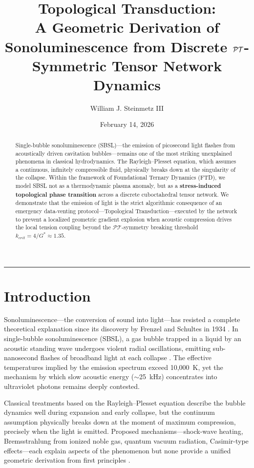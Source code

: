 \documentclass[11pt, letterpaper]{article}
\title{\vspace{-3em}\textbf{Topological Transduction:\\ \large A Geometric Derivation of Sonoluminescence from Discrete $\PT$-Symmetric Tensor Network Dynamics}}
\author[1]{William J. Steinmetz III}
\affil[1]{\textit{Foundational Ternary Dynamics Research}}
\date{February 14, 2026}
\newcommand{\G}{G^*}
\newcommand{\PT}{\mathcal{PT}}
\theoremstyle{definition}
\theoremstyle{remark}
\begin{document}
\maketitle

\begin{abstract}
Single-bubble sonoluminescence (SBSL)---the emission of picosecond light flashes from acoustically driven cavitation bubbles---remains one of the most striking unexplained phenomena in classical hydrodynamics. The Rayleigh--Plesset equation, which assumes a continuous, infinitely compressible fluid, physically breaks down at the singularity of the collapse. Within the framework of Foundational Ternary Dynamics (FTD), we model SBSL not as a thermodynamic plasma anomaly, but as a \textbf{stress-induced topological phase transition} across a discrete cuboctahedral tensor network. We demonstrate that the emission of light is the strict algorithmic consequence of an emergency data-venting protocol---Topological Transduction---executed by the network to prevent a localized geometric gradient explosion when acoustic compression drives the local tension coupling beyond the $\PT$-symmetry breaking threshold $k_{crit} = 4/\G \approx 1.35$.
\end{abstract}

\vspace{1em}
\hrule
\vspace{1.5em}

\section{Introduction}

Sonoluminescence---the conversion of sound into light---has resisted a complete theoretical explanation since its discovery by Frenzel and Schultes in 1934 \cite{Frenzel1934}. In single-bubble sonoluminescence (SBSL), a gas bubble trapped in a liquid by an acoustic standing wave undergoes violent radial oscillations, emitting sub-nanosecond flashes of broadband light at each collapse \cite{Gaitan1992, Barber1997}. The effective temperatures implied by the emission spectrum exceed 10,000~K, yet the mechanism by which slow acoustic energy ($\sim$25~kHz) concentrates into ultraviolet photons remains deeply contested.

Classical treatments based on the Rayleigh--Plesset equation \cite{RayleighPlesset} describe the bubble dynamics well during expansion and early collapse, but the continuum assumption physically breaks down at the moment of maximum compression, precisely when the light is emitted. Proposed mechanisms---shock-wave heating, Bremsstrahlung from ionized noble gas, quantum vacuum radiation, Casimir-type effects---each explain aspects of the phenomenon but none provide a unified geometric derivation from first principles \cite{Brenner2002}.
\end{document}
